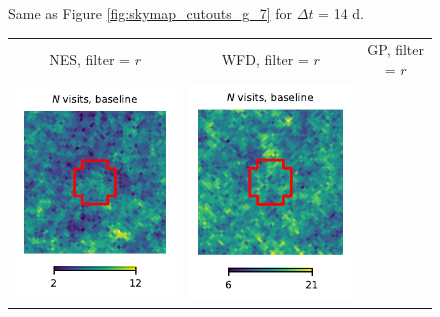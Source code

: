 \documentclass[preprintm,linenumbers]{aastex631}
\begin{document}
\begin{figure}
\begin{tabular}{  c c c}
			\end{tabular}
			\caption{
   Same as Figure \ref{fig:skymap_cutouts_g_7} for $\Delta t$ = 14 d. 
    }
	\label{fig:skymap_cutouts_g_14}
		\end{figure}

  
  	\begin{figure}
			\centering
			\begin{tabular}{  c c c}
                 NES, filter = $r$ & WFD, filter = $r$ & GP, filter = $r$ \\
				\includegraphics{results/skymaps_cutout/skymaps_cutout_first_year_one_snap_v4_0_10yrs_db_noDD_noTwi_nside-256_CountMetric_r_NES_noDD_noTwi.pdf} &
				\includegraphics{results/skymaps_cutout/skymaps_cutout_first_year_one_snap_v4_0_10yrs_db_noDD_noTwi_nside-256_CountMetric_r_WFD_noDD_noTwi.pdf} &

\end{tabular}
\end{figure}
\end{document}
